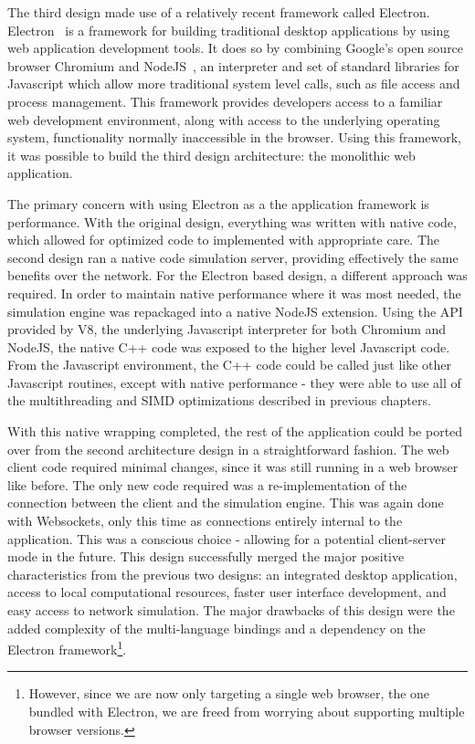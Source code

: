  The third design made use of a relatively recent framework called
 Electron. Electron~\citep{Electron:2016} is a framework for building
 traditional desktop applications by using web application development
 tools. It does so by combining Google's open source browser Chromium
 and NodeJS~\citep{NodeJS:2017}, an interpreter and set of standard libraries for
 Javascript which allow more traditional system level calls, such as
 file access and process management. This framework provides
 developers access to a familiar web development environment, along
 with access to the underlying operating system, functionality
 normally inaccessible in the browser. Using this framework, it was
 possible to build the third design architecture: the monolithic web
 application.

 The primary concern with using Electron as a the application
 framework is performance. With the original design, everything was
 written with native code, which allowed for optimized code to
 implemented with appropriate care. The second design ran a native
 code simulation server, providing effectively the same benefits over
 the network. For the Electron based design, a different approach was
 required. In order to maintain native performance where it was most
 needed, the simulation engine was repackaged into a native NodeJS
 extension. Using the API provided by V8, the underlying Javascript
 interpreter for both Chromium and NodeJS, the native C++ code was
 exposed to the higher level Javascript code. From the Javascript
 environment, the C++ code could be called just like other Javascript
 routines, except with native performance - they were able to use all
 of the multithreading and SIMD optimizations described in previous
 chapters.

 With this native wrapping completed, the rest of the application
 could be ported over from the second architecture design in a
 straightforward fashion. The web client code required minimal
 changes, since it was still running in a web browser like before. The
 only new code required was a re-implementation of the connection
 between the client and the simulation engine. This was again done
 with Websockets, only this time as connections entirely internal to
 the application. This was a conscious choice - allowing for a
 potential client-server mode in the future. This design successfully
 merged the major positive characteristics from the previous two
 designs: an integrated desktop application, access to local
 computational resources, faster user interface development, and easy
 access to network simulation. The major drawbacks of this design were
 the added complexity of the multi-language bindings and a dependency
 on the Electron framework\footnote{However, since we are now only
   targeting a single web browser, the one bundled with Electron, we
   are freed from worrying about supporting multiple browser versions.}. 

 
